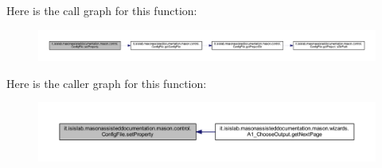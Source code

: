 Here is the call graph for this function\-:
\nopagebreak
\begin{figure}[H]
\begin{center}
\leavevmode
\includegraphics[width=350pt]{classit_1_1isislab_1_1masonassisteddocumentation_1_1mason_1_1control_1_1_config_file_ae68816366df216e1d9525047c91e77fc_cgraph}
\end{center}
\end{figure}




Here is the caller graph for this function\-:
\nopagebreak
\begin{figure}[H]
\begin{center}
\leavevmode
\includegraphics[width=350pt]{classit_1_1isislab_1_1masonassisteddocumentation_1_1mason_1_1control_1_1_config_file_ae68816366df216e1d9525047c91e77fc_icgraph}
\end{center}
\end{figure}





